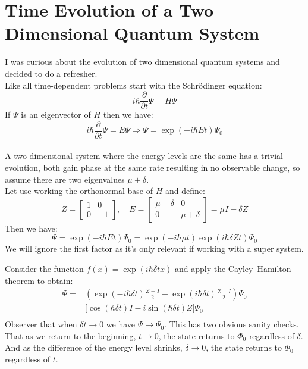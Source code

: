 
\section{Time Evolution of a Two Dimensional Quantum System}
I was curious about the evolution of two dimensional quantum systems and decided to do a refresher. 
\\

Like all time-dependent problems start with the Schrödinger equation:
\[i\hbar \frac{\partial}{\partial t}\Psi = H\Psi\]
If $\Psi$ is an eigenvector of $H$ then we have:
\[i\hbar \frac{\partial}{\partial t}\Psi = E\Psi \Rightarrow \Psi = \exp(-i\hbar E t)\Psi_0\]
\\

A two-dimensional system where the energy levels are the same has a trivial evolution,
both gain phase at the same rate resulting in no observable change,
so assume there are two eigenvalues $\mu\pm\delta$.
\\

Let use working the orthonormal base of $H$ and define:
\[Z = \begin{bmatrix} 1&0\\0&-1\end{bmatrix},\quad E = \begin{bmatrix} \mu-\delta&0\\0&\mu+\delta\end{bmatrix}=\mu I -\delta Z\]
Then we have:
\[\Psi = \exp(-i\hbar E t)\Psi_0 = \exp(-i\hbar \mu t)\exp(i\hbar \delta Zt)\Psi_0\]
We will ignore the first factor as it's only relevant if working with a super system.

Consider the function $f(x) = \exp(i\hbar\delta t x)$ and apply the Cayley–Hamilton theorem to obtain:
\begin{equation*}
\begin{aligned}
\Psi =& \left(\exp(-i\hbar\delta t)\frac{Z+I}{2}-\exp(i\hbar\delta t)\frac{Z-I}{2}\right)\Psi_0 \\
=& \big[\cos(\hbar\delta t)I-i\sin(\hbar\delta t)Z\big]\Psi_0 \\
\end{aligned}
\end{equation*}
Observer that when $\delta t \rightarrow 0$ we have $\Psi \rightarrow \Psi_0$. 
This has two obvious sanity checks.
That as we return to the beginning, $t\rightarrow 0$, the state returns to $\Phi_0$ regardless of $\delta$.
And as the difference of the energy level shrinks, $\delta\rightarrow 0$, the state returns to $\Phi_0$ regardless of $t$.
\\

